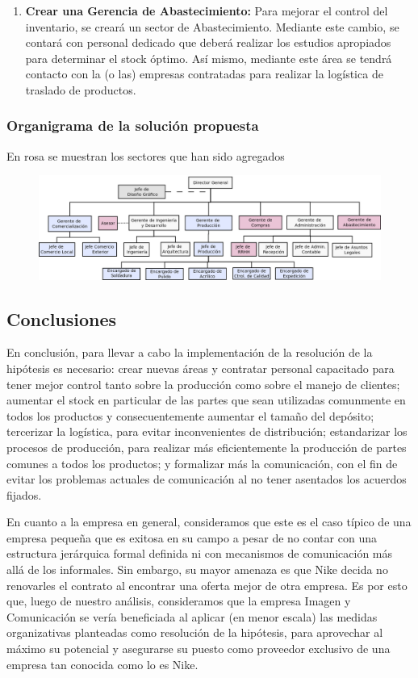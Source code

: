 \documentclass[a4paper,10pt,titlepage]{article}
\begin{document}
\begin{enumerate}
\item \textbf{Crear una Gerencia de Abastecimiento:} Para mejorar el control del inventario, se crear\'a un sector de Abastecimiento. Mediante este cambio, se contar\'a con personal dedicado que deber\'a realizar los estudios apropiados para determinar el stock \'optimo. As\'i mismo, mediante este \'area se tendr\'a contacto con la (o las) empresas contratadas para realizar la log\'istica de traslado de productos.

\end{enumerate}


\newpage
\subsubsection{Organigrama de la soluci\'on propuesta}
En rosa se muestran los sectores que han sido agregados
\begin{figure}[H]
\centering
\includegraphics[angle=90,scale=0.5]{./Organigramas/OrganiHipotesis.png}
\end{figure}


\newpage
\subsection{Conclusiones}

En conclusión, para llevar a cabo la implementación de la resolución de la hipótesis es necesario:
crear nuevas \'areas y contratar personal capacitado para tener mejor control tanto sobre la producci\'on como sobre el manejo de clientes; 
aumentar el stock en particular de las partes que sean utilizadas comunmente en todos los productos y consecuentemente aumentar el tama\~no del dep\'osito;
tercerizar la log\'istica, para evitar inconvenientes de distribuci\'on; estandarizar los procesos de producci\'on, para realizar m\'as eficientemente la 
producci\'on de partes comunes a todos los productos;  y formalizar m\'as la comunicaci\'on, con el fin de evitar los problemas actuales de comunicaci\'on 
al no tener asentados los acuerdos fijados.

En cuanto a la empresa en general, consideramos que este es el caso t\'ipico de una empresa peque\~na que es exitosa en su campo a pesar de no contar 
con una estructura jer\'arquica formal definida ni con mecanismos de comunicaci\'on m\'as all\'a de los informales. Sin embargo, su mayor amenaza es que 
Nike decida no renovarles el contrato al encontrar una oferta mejor de otra empresa. Es por esto que, luego de nuestro an\'alisis, consideramos que
 la empresa Imagen y Comunicaci\'on se ver\'ia beneficiada al aplicar (en menor escala) las medidas organizativas planteadas como resoluci\'on de la hip\'otesis,
para aprovechar al m\'aximo su potencial y asegurarse su puesto como proveedor exclusivo de una empresa tan conocida como lo es Nike.
\end{document}
